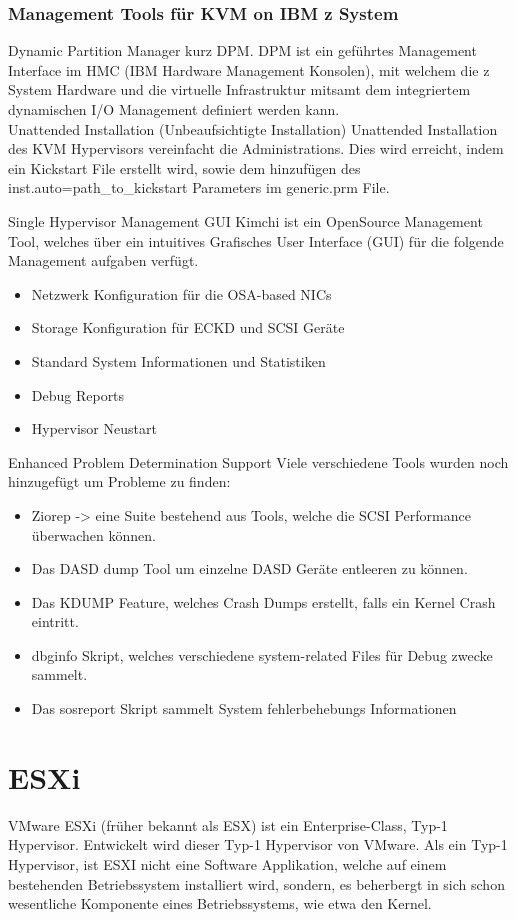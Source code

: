 \documentclass[14pt]{extreport}
\begin{document}
\subsection{Management Tools für KVM on IBM z System}
Dynamic Partition Manager kurz DPM.
DPM ist ein geführtes Management Interface im HMC (IBM Hardware Management Konsolen), mit welchem die z System Hardware und die virtuelle Infrastruktur mitsamt dem integriertem dynamischen I/O Management  definiert werden kann.\\
Unattended Installation (Unbeaufsichtigte Installation)
Unattended Installation des KVM Hypervisors vereinfacht die Administrations. Dies wird erreicht, indem ein Kickstart File erstellt wird, sowie dem hinzufügen des inst.auto=path\_to\_kickstart  Parameters im generic.prm File.

Single Hypervisor Management GUI
Kimchi ist ein OpenSource Management Tool, welches über ein intuitives Grafisches User Interface (GUI) für die folgende Management aufgaben verfügt.
\begin{itemize}
   \item Netzwerk Konfiguration für die OSA-based NICs
   \item Storage Konfiguration für ECKD und SCSI Geräte
   \item Standard System Informationen und Statistiken
   \item Debug Reports
   \item Hypervisor Neustart
\end{itemize}
\newpage
Enhanced Problem Determination Support
Viele verschiedene Tools wurden noch hinzugefügt um Probleme zu finden:
\begin{itemize}
   \item Ziorep -> eine Suite bestehend aus Tools, welche die SCSI Performance überwachen können.
   \item Das DASD dump Tool um einzelne DASD Geräte entleeren zu können.
   \item Das KDUMP Feature, welches Crash Dumps erstellt, falls ein Kernel Crash eintritt.
   \item dbginfo Skript, welches verschiedene system-related Files für Debug zwecke sammelt.
   \item Das sosreport Skript sammelt System fehlerbehebungs Informationen
\end{itemize}

\chapter{ESXi}
VMware ESXi (früher bekannt als ESX) ist ein Enterprise-Class, Typ-1 Hypervisor. Entwickelt wird dieser Typ-1 Hypervisor von VMware. Als ein Typ-1 Hypervisor, ist ESXI nicht eine Software Applikation, welche auf einem bestehenden Betriebssystem installiert wird, sondern, es beherbergt in sich schon wesentliche Komponente eines Betriebssystems, wie etwa den Kernel. \\
\end{document}
